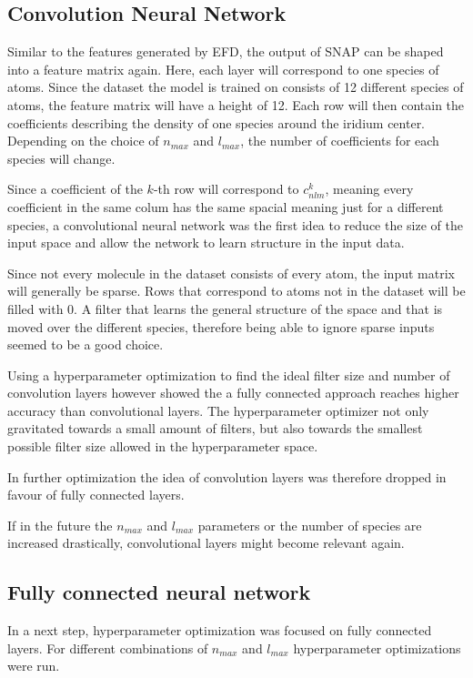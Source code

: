 \subsection{Convolution Neural Network}

Similar to the features generated by EFD, the output of SNAP can be shaped into a feature matrix again.
Here, each layer will correspond to one species of atoms.
Since the dataset the model is trained on consists of 12 different species of atoms, the feature matrix will have a height of 12.
Each row will then contain the coefficients describing the density of one species around the iridium center.
Depending on the choice of $n_{max}$ and $l_{max}$, the number of coefficients for each species will change.

Since a coefficient of the $k$-th row will correspond to $c^k_{nlm}$, meaning every coefficient in the same colum has the same spacial meaning just for a different species,
a convolutional neural network was the first idea to reduce the size of the input space and allow the network to learn structure in the input data.

Since not every molecule in the dataset consists of every atom, the input matrix will generally be sparse.
Rows that correspond to atoms not in the dataset will be filled with 0.
A filter that learns the general structure of the space and that is moved over the different species, therefore 
being able to ignore sparse inputs seemed to be a good choice.

Using a hyperparameter optimization to find the ideal filter size and number of convolution layers however showed
the a fully connected approach reaches higher accuracy than convolutional layers.
The hyperparameter optimizer not only gravitated towards a small amount of filters, but also towards 
the smallest possible filter size allowed in the hyperparameter space.

In further optimization the idea of convolution layers was therefore dropped in favour of fully connected layers.

If in the future the $n_{max}$ and $l_{max}$ parameters or the number of species are increased drastically, 
convolutional layers might become relevant again.

\subsection{Fully connected neural network}

In a next step, hyperparameter optimization was focused on fully connected layers.
For different combinations of $n_{max}$ and $l_{max}$ hyperparameter optimizations were run.

